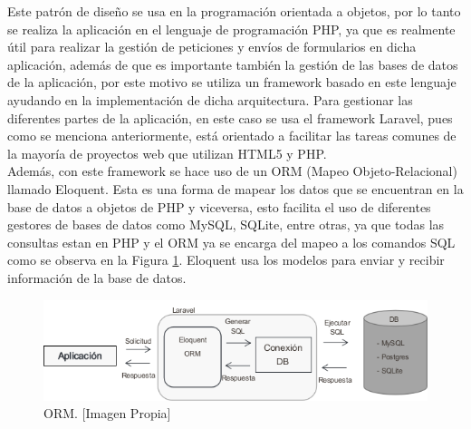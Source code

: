 Este patrón de diseño se usa en la programación orientada a objetos, por lo tanto se realiza la aplicación en el lenguaje de programación PHP, ya que es realmente útil para realizar la gestión de peticiones y envíos de formularios en dicha aplicación, además de que es importante también la gestión de las bases de datos de la aplicación, por este motivo se utiliza un framework basado en este lenguaje ayudando en la implementación de dicha arquitectura. Para gestionar las diferentes partes de la aplicación, en este caso se usa el framework Laravel, pues como se menciona anteriormente, está orientado a facilitar las tareas comunes de la mayoría de proyectos web que utilizan HTML5 y PHP.\\

Además, con este framework se hace uso de un ORM (Mapeo Objeto-Relacional) llamado Eloquent. Esta es una forma de mapear los datos que se encuentran en la base de datos a objetos de PHP y viceversa, esto facilita el uso de diferentes gestores de bases de datos como MySQL, SQLite, entre otras, ya que todas las consultas estan en PHP y el ORM ya se encarga del mapeo a los comandos SQL como se observa en la Figura \ref{fig:orm}. Eloquent usa los modelos para enviar y recibir información de la base de datos\cite{Eloq}.\\

\begin{figure}[H]
	\centering
	\caption[ORM]{ORM. [Imagen Propia]}
	\label{fig:orm}
	\includegraphics[width=0.7\linewidth]{Imagenes/ORM}
\end{figure}
